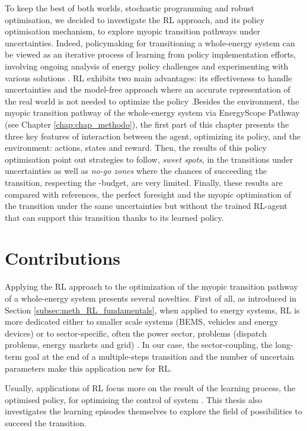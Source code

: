 To keep the best of both worlds, \ie stochastic programming and robust optimisation, we decided to investigate the \gls{RL} approach, and its policy optimisation mechanism, to explore myopic transition pathways under uncertainties. Indeed, policymaking for transitioning a whole-energy system can be viewed as an iterative process of learning from policy implementation efforts, involving ongoing analysis of energy policy challenges and experimenting with various solutions \cite{howlett1995studying}. \gls{RL} exhibits two main advantages: its effectiveness to handle uncertainties and the model-free approach where an accurate representation of the real world is not needed to optimize the policy \cite{perera2021applications}.Besides the environment, \ie the myopic transition pathway of the whole-energy system via EnergyScope Pathway (see Chapter \ref{chap:chap_methodo}), the first part of this chapter presents the three key features of interaction between the agent, optimizing its policy, and the environment: actions, states and reward.  Then, the results of this policy optimisation point out strategies to follow, \ie \textit{sweet spots}, in the transitions under uncertainties as well as \textit{no-go zones} where the chances of succeeding the transition, \ie respecting the -budget, are very limited. Finally, these results are compared with references, \ie the perfect foresight and the myopic optimisation of the transition under the same uncertainties but without the trained \gls{RL}-agent that can support this transition thanks to its learned policy.

\section*{Contributions}
\label{sec:meth:contributions}
Applying the \gls{RL} approach to the optimization of the myopic transition pathway of a whole-energy system presents several novelties. First of all, as introduced in Section \ref{subsec:meth_RL_fundamentals}, when applied to energy systems, \gls{RL} is more dedicated either to smaller scale systems (\eg \gls{BEMS}, vehicles and energy devices) or to sector-specific, often the power sector, problems (\eg dispatch problems, energy markets and grid) \cite{perera2021applications}. In our case, the sector-coupling, the long-term goal at the end of a multiple-steps transition and the number of uncertain parameters make this application new for \gls{RL}.

Usually, applications of \gls{RL} focus more on the result of the learning process, the optimised policy, for optimising the control of system \cite{perera2021applications}. This thesis also investigates the learning episodes themselves to explore the field of possibilities to succeed the transition.

